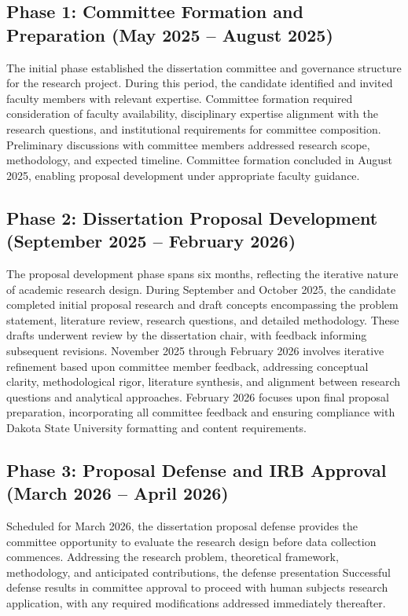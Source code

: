 \subsection{Phase 1: Committee Formation and Preparation (May 2025 -- August 2025)}

The initial phase established the dissertation committee and governance structure for the research project. During this period, the candidate identified and invited faculty members with relevant expertise. Committee formation required consideration of faculty availability, disciplinary expertise alignment with the research questions, and institutional requirements for committee composition. Preliminary discussions with committee members addressed research scope, methodology, and expected timeline. Committee formation concluded in August 2025, enabling proposal development under appropriate faculty guidance.

\subsection{Phase 2: Dissertation Proposal Development (September 2025 -- February 2026)}

The proposal development phase spans six months, reflecting the iterative nature of academic research design. During September and October 2025, the candidate completed initial proposal research and draft concepts encompassing the problem statement, literature review, research questions, and detailed methodology. These drafts underwent review by the dissertation chair, with feedback informing subsequent revisions. November 2025 through February 2026 involves iterative refinement based upon committee member feedback, addressing conceptual clarity, methodological rigor, literature synthesis, and alignment between research questions and analytical approaches. February 2026 focuses upon final proposal preparation, incorporating all committee feedback and ensuring compliance with Dakota State University formatting and content requirements.

\subsection{Phase 3: Proposal Defense and IRB Approval (March 2026 -- April 2026)}

Scheduled for March 2026, the dissertation proposal defense provides the committee opportunity to evaluate the research design before data collection commences. Addressing the research problem, theoretical framework, methodology, and anticipated contributions, the defense presentation Successful defense results in committee approval to proceed with human subjects research application, with any required modifications addressed immediately thereafter.

